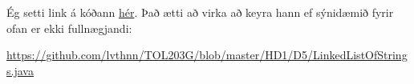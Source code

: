 \documentclass[a4paper, 12pt]{article}
\begin{document}
\begin{description}[leftmargin=!,labelwidth=\widthof{\bfseries Example:},labelindent=0em, ]
  \medskip
  Ég setti link á kóðann \href{https://github.com/lvthnn/TOL203G/blob/master/HD1/D5/LinkedListOfStrings.java}{hér}. Það ætti
  að virka að keyra hann ef sýnidæmið fyrir ofan er ekki fullnægjandi:

  \url{https://github.com/lvthnn/TOL203G/blob/master/HD1/D5/LinkedListOfStrings.java}
\end{description}
\end{document}

